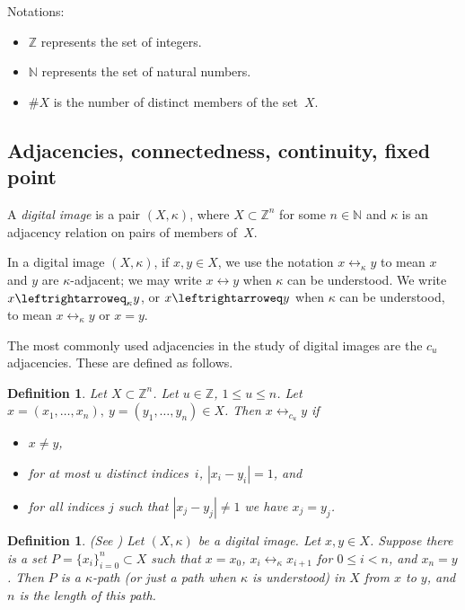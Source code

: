 \documentclass{article}
\newtheorem{definition}[thm]{Definition}
\numberwithin{thm}{section}
\newcommand{\adj}{\leftrightarrow}
\newcommand{\adjeq}{\leftrightarroweq}
\def\Z{{\mathbb Z}}
\def\N{{\mathbb N}}
\begin{document}
Notations:
\begin{itemize}
    \item $\Z$ represents the set of integers.
    \item $\N$ represents the set of natural numbers.
    \item $\#X$ is the number of distinct
    members of the set~$X$.
\end{itemize}

\subsection{Adjacencies, connectedness, 
continuity, fixed point}

A {\em digital image} is a pair $(X,\kappa)$,
where $X \subset \Z^n$ for some $n \in \N$ and
$\kappa$ is an adjacency relation on pairs of
members of~$X$.

In a digital image $(X,\kappa)$, if
$x,y \in X$, we use the notation
$x \adj_{\kappa}y$ to
mean $x$ and $y$ are $\kappa$-adjacent; we may write
$x \adj y$ when $\kappa$ can be understood. 
We write $x \adjeq_{\kappa}y$, or $x \adjeq y$
when $\kappa$ can be understood, to
mean 
$x \adj_{\kappa}y$ or $x=y$.

The most commonly used adjacencies in the study of digital images 
are the $c_u$ adjacencies. These are defined as follows.
\begin{definition}
\label{cu-adj-Def}
Let $X \subset \Z^n$. Let $u \in \Z$, $1 \le u \le n$. Let 
$x=(x_1, \ldots, x_n),~y=(y_1,\ldots,y_n) \in X$. Then $x \adj_{c_u} y$ if 
\begin{itemize}
    \item $x \neq y$,
    \item for at most $u$ distinct indices~$i$,
    $|x_i - y_i| = 1$, and
    \item for all indices $j$ such that $|x_j - y_j| \neq 1$ we have $x_j=y_j$.
\end{itemize}
\end{definition}

\begin{definition}
\label{path}
{\rm (See \cite{Khalimsky})} 
    Let $(X,\kappa)$ be a digital image. Let
    $x,y \in X$. Suppose there is a set
    $P = \{x_i\}_{i=0}^n \subset X$ such that
$x=x_0$, $x_i \adj_{\kappa} x_{i+1}$ for
$0 \le i < n$, and $x_n=y$. Then $P$ is a
{\em $\kappa$-path} (or just a {\em path}
when $\kappa$ is understood) in $X$ from $x$ to $y$,
and $n$ is the {\em length} of this path.
\end{definition}
\end{document}
